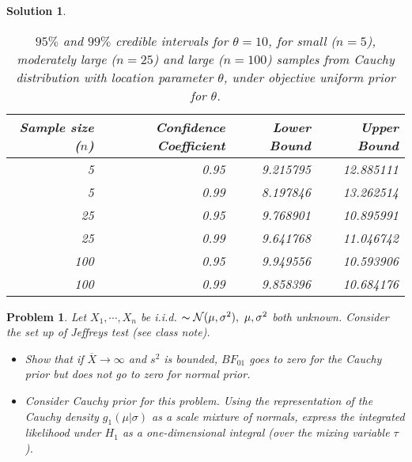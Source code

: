 \documentclass[12pt]{article}
\theoremstyle{problemstyle}
\newtheorem{pbm}{Problem}
\newtheorem*{solution*}{Solution}
\newenvironment{problem}{
\begin{tcolorbox}[colback=green!10!white,colframe=black!75!black, parbox = false]\begin{pbm} }{\end{pbm}\end{tcolorbox} }
\newcommand{\normal}{\mathcal{N}}
\begin{document}
\begin{solution*}
    \begin{table}[ht]
        \centering
        \begin{tabular}{rrrr}
            \toprule
            \textbf{Sample size ($n$)} & \textbf{Confidence Coefficient} & \textbf{Lower Bound} & \textbf{Upper Bound}\\
            \midrule
            5 & 0.95 & 9.215795 & 12.885111\\
            5 & 0.99 & 8.197846 & 13.262514\\
            \midrule
            25 & 0.95 & 9.768901 & 10.895991\\
            25 & 0.99 & 9.641768 & 11.046742\\
            \midrule
            100 & 0.95 & 9.949556 & 10.593906\\
            100 & 0.99 & 9.858396 & 10.684176\\
            \bottomrule
        \end{tabular}
        \caption{$95\%$ and $99\%$ credible intervals for $\theta = 10$, for small ($n = 5$), moderately large ($n = 25$) and large ($n = 100$) samples from Cauchy distribution with location parameter $\theta$, under objective uniform prior for $\theta$.}
    \end{table}

\end{solution*}
\pagebreak


\begin{problem}
Let $X_1,\cdots, X_n$ be i.i.d. $\thicksim \normal(\mu,\sigma^2),\ \mu, \sigma^2$ both unknown. Consider the set up of Jeffreys test (see class note).
\begin{itemize}
    \item[(a)] Show that if $\overline{X}\rightarrow\infty$ and $s^2$ is bounded, $BF_{01}$ goes to zero for the Cauchy prior but does not go to zero for normal prior.
    
    \item[(b)] Consider Cauchy prior for this problem. Using the representation of the Cauchy density $g_1(\mu|\sigma)$ as a scale mixture of normals, express the integrated likelihood under $H_1$ as a one-dimensional integral (over the mixing variable $\tau$).
\end{itemize}
\end{problem}
\end{document}
